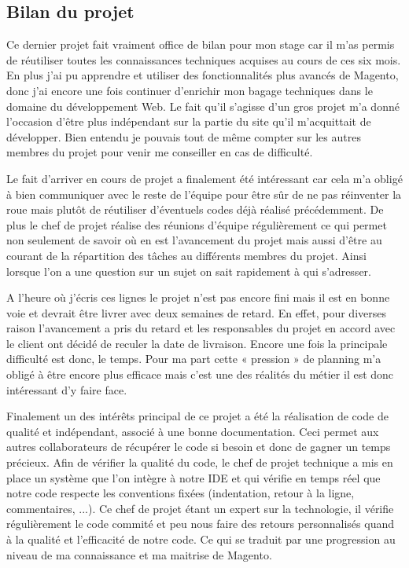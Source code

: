 \documentclass[a4paper,11pt,twoside]{report}
\begin{document}
    \subsection*{Bilan du projet}
    Ce dernier projet fait vraiment office de bilan pour mon stage car il m'as permis de réutiliser toutes les connaissances techniques acquises au cours de ces six mois. En plus j'ai pu apprendre et utiliser des fonctionnalités plus avancés de Magento, donc j'ai encore une fois continuer d'enrichir mon bagage techniques dans le domaine du développement Web. Le fait qu'il s'agisse d'un gros projet m'a donné l'occasion d'être plus indépendant sur la partie du site qu'il m'acquittait de développer. Bien entendu je pouvais tout de même compter sur les autres membres du projet pour venir me conseiller en cas de difficulté.
    
    Le fait d'arriver en cours de projet a finalement été intéressant car cela m'a obligé à bien communiquer avec le reste de l'équipe pour être sûr de ne pas réinventer la roue mais plutôt de réutiliser d'éventuels codes déjà réalisé précédemment. De plus le chef de projet réalise des réunions d'équipe régulièrement ce qui permet non seulement de savoir où en est l'avancement du projet mais aussi d'être au courant de la répartition des tâches au différents membres du projet. Ainsi lorsque l'on a une question sur un sujet on sait rapidement à qui s'adresser. 
    
    A l'heure où j'écris ces lignes le projet n'est pas encore fini mais il est en bonne voie et devrait être livrer avec deux semaines de retard. En effet, pour diverses raison l'avancement a pris du retard et les responsables du projet en accord avec le client ont décidé de reculer la date de livraison. Encore une fois la principale difficulté est donc, le temps. Pour ma part cette « pression » de planning m'a obligé à être encore plus efficace mais c'est une des réalités du métier il est donc intéressant d'y faire face. 
    
    Finalement un des intérêts principal de ce projet a été la réalisation de code de qualité et indépendant, associé à une bonne documentation. Ceci permet aux autres collaborateurs de récupérer le code si besoin et donc de gagner un temps précieux. Afin de vérifier la qualité du code, le chef de projet technique a mis en place un système que l'on intègre à notre IDE et qui vérifie en temps réel que notre code respecte les conventions fixées (indentation, retour à la ligne, commentaires, ...). Ce chef de projet étant un expert sur la technologie, il vérifie régulièrement le code commité et peu nous faire des retours personnalisés quand à la qualité et l'efficacité de notre code. Ce qui se traduit par une progression au niveau de ma connaissance et ma maitrise de Magento. 
    
\end{document}
